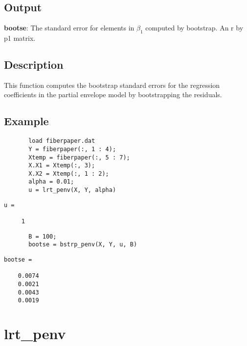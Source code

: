 \documentclass[a4paper,11pt,openany]{memoir}
\begin{document}
\subsection*{Output}

\begin{par}
\textbf{bootse}: The standard error for elements in $\beta_1$ computed by bootstrap.  An r by p1 matrix.
\end{par} \vspace{1em}


\subsection*{Description}

\begin{par}
This function computes the bootstrap standard errors for the regression coefficients in the partial envelope model by bootstrapping the residuals.
\end{par} \vspace{1em}


\subsection*{Example}


\begin{verbatim}       load fiberpaper.dat
       Y = fiberpaper(:, 1 : 4);
       Xtemp = fiberpaper(:, 5 : 7);
       X.X1 = Xtemp(:, 3);
       X.X2 = Xtemp(:, 1 : 2);
       alpha = 0.01;
       u = lrt_penv(X, Y, alpha)\end{verbatim}
               \color{lightgray}\ttfamily \begin{verbatim}
u =

     1
\end{verbatim} \rmfamily
\color{black}
\begin{verbatim}       B = 100;
       bootse = bstrp_penv(X, Y, u, B)\end{verbatim}
    
        \color{lightgray}\ttfamily \begin{verbatim}
bootse =

    0.0074
    0.0021
    0.0043
    0.0019

\end{verbatim} \rmfamily
\color{black}
    

\newpage


\rmfamily
\color{black}\section{lrt\_penv}
\end{document}
